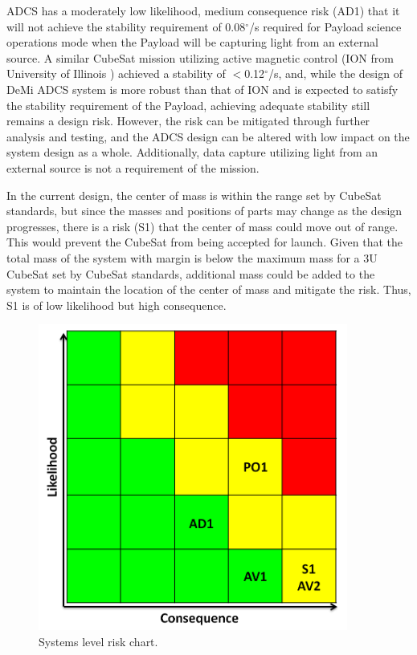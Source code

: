 \documentclass[12pt]{article}
\begin{document}
ADCS has a moderately low likelihood, medium consequence risk (AD1) that it will not achieve the stability requirement of 0.08$^\circ$/s required for Payload science operations mode when the Payload will be capturing light from an external source. A similar CubeSat mission utilizing active magnetic control (ION from University of Illinois \cite{ION-mission}) achieved a stability of $<$0.12$^\circ$/s, and, while the design of DeMi ADCS system is more robust than that of ION and is expected to satisfy the stability requirement of the Payload, achieving adequate stability still remains a design risk. However, the risk can be mitigated through further analysis and testing, and the ADCS design can be altered with low impact on the system design as a whole.  Additionally, data capture utilizing light from an external source is not a requirement of the mission.

In the current design, the center of mass is within the range set by CubeSat standards, but since the masses and positions of parts may change as the design progresses, there is a risk (S1) that the center of mass could move out of range.  This would prevent the CubeSat from being accepted for launch.  Given that the total mass of the system with margin is below the maximum mass for a 3U CubeSat set by CubeSat standards, additional mass could be added to the system to maintain the location of the center of mass and mitigate the risk. Thus, S1 is of low likelihood but high consequence. 

\begin{figure}[ht]
\centering
\includegraphics[width=4in]{images/conclusion_1.png}
\caption{Systems level risk chart.}
\label{fig:risk_chart}
\end{figure}
\end{document}
